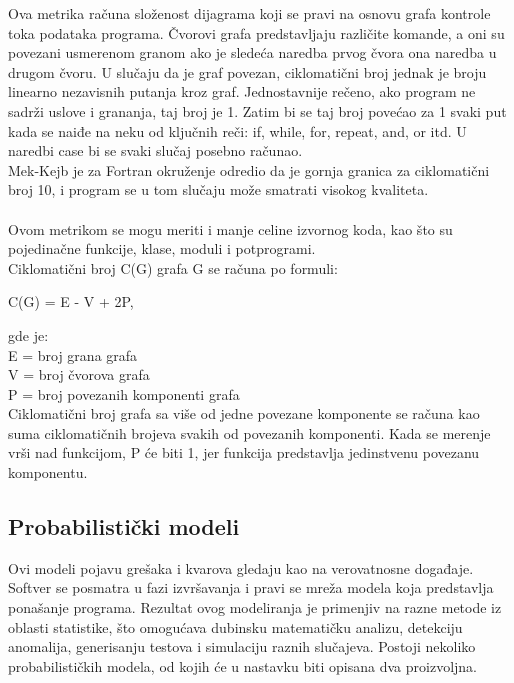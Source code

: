 \documentclass[a4paper]{article}
\begin{document}
Ova metrika računa složenost dijagrama koji se pravi na osnovu grafa kontrole toka podataka programa. Čvorovi grafa predstavljaju različite komande, a oni su povezani usmerenom granom ako je sledeća naredba prvog čvora ona naredba u drugom čvoru. U slučaju da je graf povezan, ciklomatični broj jednak je broju linearno nezavisnih putanja kroz graf. Jednostavnije rečeno, ako program ne sadrži uslove i grananja, taj broj je 1. Zatim bi se taj broj povećao za 1 svaki put kada se naiđe na neku od ključnih reči: if, while, for, repeat, and, or itd. U naredbi case bi se svaki slučaj posebno računao.\\
Mek-Kejb je za Fortran okruženje odredio da je gornja granica za ciklomatični broj 10, i program se u tom slučaju može smatrati visokog kvaliteta.\cite{mccabe_fortran}\\\\
Ovom metrikom se mogu meriti i manje celine izvornog koda, kao što su pojedinačne funkcije, klase, moduli i potprogrami.\\
Ciklomatični broj C(G) grafa G se računa po formuli:
\begin{center}
C(G) = E - V + 2P,
\end{center}
gde je:\\
E = broj grana grafa\\
V = broj čvorova grafa\\
P = broj povezanih komponenti grafa\\

Ciklomatični broj grafa sa više od jedne povezane komponente se računa kao suma ciklomatičnih brojeva svakih od povezanih komponenti. Kada se merenje vrši nad funkcijom,  P će biti 1, jer funkcija predstavlja jedinstvenu povezanu komponentu.\\

\subsection{Probabilistički modeli}
\label{sec:probabilisticki}

Ovi modeli pojavu grešaka i kvarova gledaju kao na verovatnosne događaje. Softver se posmatra u fazi izvršavanja i pravi se mreža modela koja predstavlja ponašanje programa. Rezultat ovog modeliranja je primenjiv na razne metode iz oblasti statistike, što omogućava dubinsku matematičku analizu, detekciju anomalija, generisanju testova i simulaciju raznih slučajeva. Postoji nekoliko probabilističkih modela, od kojih će u nastavku biti opisana dva proizvoljna. \\
\end{document}
